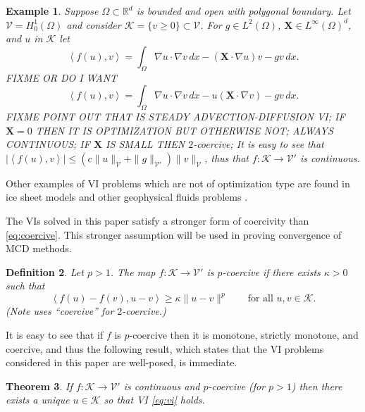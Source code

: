\documentclass[letterpaper,final,12pt,reqno]{amsart}
\theoremstyle{cstyle}
\newtheorem{theorem}{Theorem}
\theoremstyle{dstyle}
\newtheorem{definition}[theorem]{Definition}
\newtheorem{example}[theorem]{Example}
\numberwithin{equation}{section}
\numberwithin{figure}{section}
\numberwithin{table}{section}
\numberwithin{theorem}{section}
\newcommand{\RR}{\mathbb{R}}
\newcommand{\grad}{\nabla}
\newcommand{\bX}{\mathbf{X}}
\newcommand{\cK}{\mathcal{K}}
\newcommand{\cV}{\mathcal{V}}
\newcommand{\ip}[2]{\left<#1,#2\right>}
\begin{document}
\begin{example}  \label{ex:advectiondiffusion}  Suppose $\Omega \subset \RR^d$ is bounded and open with polygonal boundary.  Let $\cV = H_0^1(\Omega)$ and consider $\cK = \{v\ge 0\} \subset \cV$.  For $g\in L^2(\Omega)$, $\bX \in L^\infty(\Omega)^d$, and $u$ in $\cK$ let
\begin{equation}
\ip{f(u)}{v} = \int_\Omega \grad u \cdot \grad v\,dx - (\bX \cdot \grad u) v - gv\,dx. \label{eq:nongradientexample}
\end{equation}
FIXME OR DO I WANT
\begin{equation}
\ip{f(u)}{v} = \int_\Omega \grad u \cdot \grad v\,dx - u (\bX \cdot \grad v) - gv\,dx. \label{eq:ALTnongradientexample}
\end{equation}
FIXME POINT OUT THAT IS STEADY ADVECTION-DIFFUSION VI; IF $\bX=0$ THEN IT IS OPTIMIZATION BUT OTHERWISE NOT; ALWAYS CONTINUOUS; IF $\bX$ IS SMALL THEN $2$-coercive; It is easy to see that $|\ip{f(u)}{v}| \le (c \|u\|_{\cV} + \|g\|_{\cV'}) \|v\|_{\cV}$, thus that $f:\cK \to \cV'$ is continuous.
\end{example}

Other examples of VI problems which are not of optimization type are found in ice sheet models \cite{Calvoetal2002,JouvetBueler2012} and other geophysical fluids problems \cite{Bueler2021conservation}.

The VIs solved in this paper satisfy a stronger form of coercivity than \eqref{eq:coercive}.  This stronger assumption will be used in proving convergence of MCD methods.

\begin{definition}  Let $p>1$.  The map $f:\cK \to \cV'$ is \emph{$p$-coercive} if there exists $\kappa>0$ such that
\begin{equation}
\ip{f(u)-f(v)}{u-v} \ge \kappa \|u-v\|^p \qquad \text{for all } u,v \in \cK. \label{eq:pcoercive}
\end{equation}
(Note \cite{Tai2003} uses ``coercive'' for $2$-coercive.)
\end{definition}

It is easy to see that if $f$ is $p$-coercive then it is monotone, strictly monotone, and coercive, and thus the following result, which states that the VI problems considered in this paper are well-posed, is immediate.

\begin{theorem}  \label{thm:viwellposed}  If $f:\cK \to \cV'$ is continuous and $p$-coercive (for $p>1$) then there exists a unique $u\in \cK$ so that VI \eqref{eq:vi} holds.
\end{theorem}
\end{document}
